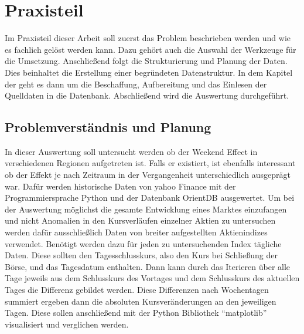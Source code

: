 \section{Praxisteil}


Im Praxisteil dieser Arbeit soll zuerst das Problem beschrieben werden und wie es fachlich gelöst werden kann. Dazu gehört auch die Auswahl der Werkzeuge für die Umsetzung. Anschließend folgt die Strukturierung und Planung der Daten. Dies beinhaltet die Erstellung einer begründeten Datenstruktur. In dem Kapitel der  geht es dann um die Beschaffung, Aufbereitung und das Einlesen der Quelldaten in die Datenbank. Abschließend wird die Auswertung durchgeführt.

\subsection{Problemverständnis und Planung}


In dieser Auswertung soll untersucht werden ob der Weekend Effect in verschiedenen Regionen aufgetreten ist. Falls er existiert, ist ebenfalls interessant ob der Effekt je nach Zeitraum in der Vergangenheit unterschiedlich ausgeprägt war. Dafür werden historische Daten von yahoo Finance mit der Programmiersprache Python und der Datenbank OrientDB ausgewertet. Um bei der Auswertung möglichst die gesamte Entwicklung eines Marktes einzufangen und nicht Anomalien in den Kursverläufen einzelner Aktien zu untersuchen werden dafür ausschließlich Daten von breiter aufgestellten Aktienindizes verwendet. Benötigt werden dazu für jeden zu untersuchenden Index tägliche Daten. Diese sollten den Tagesschlusskurs, also den Kurs bei Schließung der Börse, und das Tagesdatum enthalten. Dann kann durch das Iterieren über alle Tage jeweils aus dem Schlusskurs des Vortages und dem Schlusskurs des aktuellen Tages die Differenz gebildet werden. Diese Differenzen nach Wochentagen summiert ergeben dann die absoluten Kursveränderungen an den jeweiligen Tagen. Diese sollen anschließend mit der Python Bibliothek \enquote{matplotlib} visualisiert und verglichen werden.

